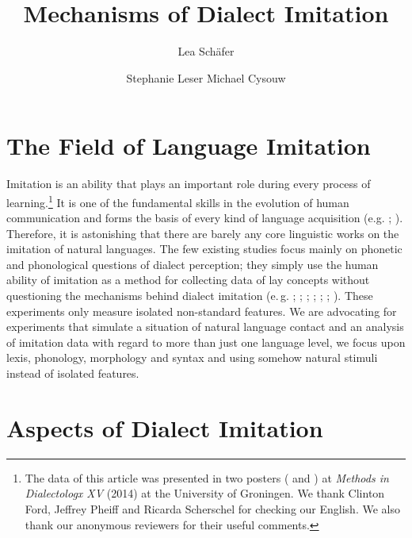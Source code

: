 \documentclass[output=paper]{LSP/langsci}
\author{Lea Schäfer\affiliation{??} \and Stephanie Leser\affiliation{??} \lastand Michael Cysouw\affiliation{??}}
\title{Mechanisms of Dialect Imitation}
\begin{document}
\newcommand{\hai}[1]{\textsf{#1}} %
\newcommand{\qu}[1]{»#1«} %
\newcommand{\quji}[1]{»#1«} %
\newcommand{\quein}[1]{›#1‹} %
\newcommand{\quf}[1]{\frqq#1\flqq} %
\newcommand{\qufs}[1]{\frq#1\flq} %
\newcommand{\sem}[1]{``#1''} %
   

\section{The Field of Language Imitation}\label{abstract}

Imitation is an ability that plays an important role during every process of learning.\footnote{The data of this article was presented in two posters (\citealt{schafer_language_2014} and \citealt{schafer_fictional_2014}) at \textit{Methods in Dialectologx XV} (2014) at the University of Groningen. We thank Clinton Ford, Jeffrey Pheiff and Ricarda Scherschel for checking our English. We also thank our anonymous reviewers for their useful comments.} It is one of the fundamental skills in the evolution of human communication and forms the basis of every kind of language acquisition  (e.g. \citealt{fitch_evolution_2010,hauser_language_2002,petkov_birds_2012,uzgiris_two_1981,markham_phonetic_1997,markham_listeners_1999,meltzoff_imitation_1977,meltzoff_imitative_2002}; \citealt[123]{tomasello_shared_2007}). Therefore, it is astonishing that there are barely any core linguistic works on the imitation of natural languages. The few existing studies focus mainly on phonetic and phonological questions of dialect perception; they simply use the human ability of imitation as a method for collecting data of lay concepts without questioning the mechanisms behind dialect imitation (e.\,g. \cite{segerup_imitation_1999}; \cite{siegel_second_2010}; \cite{adank_imitation_2010}; \cite{purschke_imitation_2010}; \cite{babel_phonetic_2009}; \cite{neuhauser_phonetische_2012}; \cite{dossey_spontaneous_2012}). These experiments only measure isolated non-standard features. We are advocating for experiments that simulate a situation of natural language contact and an analysis of imitation data with regard to more than just one language level, we focus upon lexis, phonology, morphology and syntax and using somehow natural stimuli instead of isolated features.
   
\section{Aspects of Dialect Imitation}\label{aspects}
\end{document}
